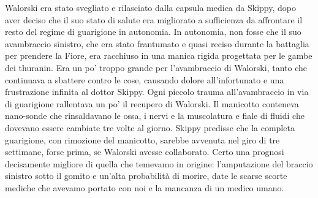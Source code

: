 Walorski era stato svegliato e rilasciato dalla capsula medica da
Skippy, dopo aver deciso che il suo stato di salute era migliorato a
sufficienza da affrontare il resto del regime di guarigione in
autonomia. In autonomia, non fosse che il suo avambraccio sinistro, che
era stato frantumato e quasi reciso durante la battaglia per prendere la
Fiore, era racchiuso in una manica rigida progettata per le gambe dei
thuranin. Era un po' troppo grande per l'avambraccio di Walorski, tanto
che continuava a sbattere contro le cose, causando dolore
all'infortunato e una frustrazione infinita al dottor Skippy. Ogni
piccolo trauma all'avambraccio in via di guarigione rallentava un po' il
recupero di Walorski. Il manicotto conteneva nano-sonde che rinsaldavano
le ossa, i nervi e la muscolatura e fiale di fluidi che dovevano essere
cambiate tre volte al giorno. Skippy predisse che la completa
guarigione, con rimozione del manicotto, sarebbe avvenuta nel giro di
tre settimane, forse prima, se Walorski avesse collaborato. Certo una
prognosi decisamente migliore di quella che temevamo in origine:
l'amputazione del braccio sinistro sotto il gomito e un'alta probabilità
di morire, date le scarse scorte mediche che avevamo portato con noi e
la mancanza di un medico umano.

\hfill\break

